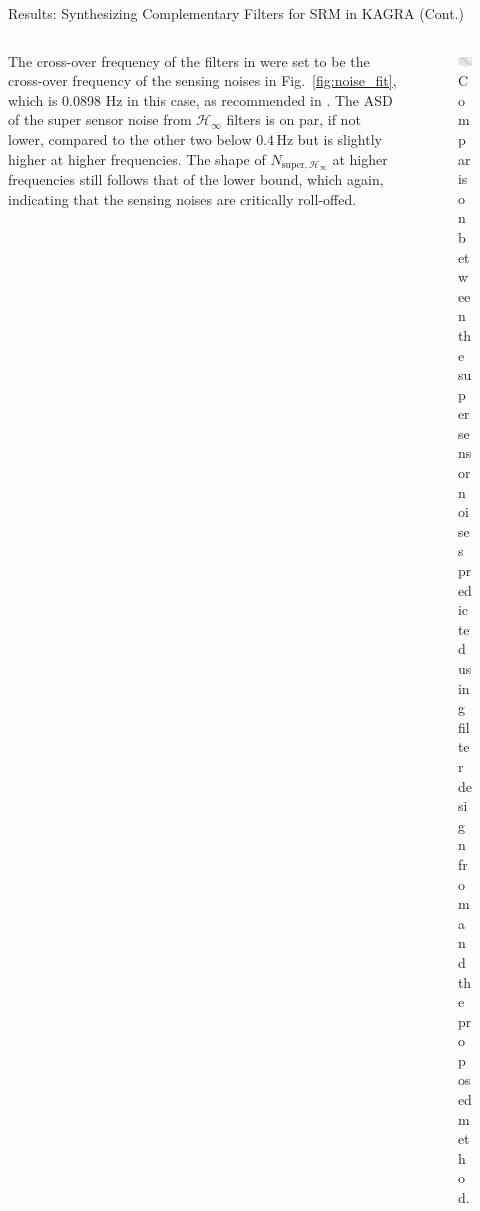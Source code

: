 \documentclass{beamer}
\begin{document}
\begin{frame}[t]
\begin{columns}[t]
\begin{column}{0.32\linewidth}
\begin{block}{Results: Synthesizing Complementary Filters for SRM in KAGRA (Cont.)}
			\medskip
			
			\begin{columns}[onlytextwidth]
				\begin{column}{0.45\textwidth}
					The cross-over frequency of the filters in \cite{Sekiguchi:2016bmv, vanHeijningen:2018cpc} were set to be the cross-over frequency of the sensing noises in Fig.~\ref{fig:noise_fit}, which is 0.0898 Hz in this case, as recommended in \cite{Sekiguchi:2016bmv}.
					The ASD of the super sensor noise from $\mathcal{H}_\infty$ filters is on par, if not lower, compared to the other two below $0.4\,\text{Hz}$ but is slightly higher at higher frequencies.
					The shape of $N_{\text{super}, \mathcal{H}_\infty}$ at higher frequencies still follows that of the lower bound, which again, indicating that the sensing noises are critically roll-offed.
				\end{column}
				\begin{column}{0.5\textwidth}
					\begin{figure}
						\centering
						\includegraphics[width=1\linewidth]{super_sensor_noise_comparison}
						\caption{Comparison between the super sensor noises predicted using filter design from \cite{Sekiguchi:2016bmv, vanHeijningen:2018cpc} and the proposed method.}
						\label{fig:super_sensor_noise_comparison}
					\end{figure}
				\end{column}
			\end{columns}

			\medskip
			

\end{block}
\end{column}
\end{columns}
\end{frame}
\end{document}
